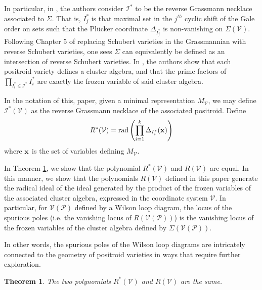 \documentclass[11pt]{article}
\newcommand{\cP}{\mathcal{P}}
\newcommand{\cV}{\mathcal{V}}
\newcommand{\VP}{\cV(\cP)}
\newcommand{\cI}{\mathcal{I}}
\newtheorem{thm}{Theorem}[section]
\theoremstyle{remark}
\theoremstyle{definition}
\begin{document}
In particular, in \cite{galashinlam19}, the authors consider $\cI^*$ to be the reverse Grassmann necklace associated to $\Sigma$. That is, $I^{\ast}_j$ is that maximal set in the $j^{th}$ cyclic shift of the Gale order on sets such that the Pl\"{u}cker coordinate $\Delta_{I^*_j}$ is non-vanishing on $\Sigma(\cV)$. Following Chapter 5 of \cite{Juggling} replacing Schubert varieties in the Grassmannian with reverse Schubert varieties, one sees $\Sigma$ can equivalently be defined as an intersection of reverse Schubert varieties. In \cite{SS-BW}, the authors show that each positroid variety defines a cluster algebra, and that the prime factors of $\prod_{I_i^\ast \in \cI^\ast}I_i^\ast$ are exactly the frozen variable of said cluster algebra. 

In the notation of this, paper, given a minimal representation $M_{\cV}$, we may define $\cI^\ast(\cV)$ as the reverse Grassmann necklace of the associated positroid. Define
%
\begin{displaymath}
R^{\ast}(\cV) = \mathrm{rad}\left(\prod_{i = 1}^{k} \Delta_{I^{\ast}_i}(\bf{x})\right)
\end{displaymath}
where $\bf{x}$ is the set of variables defining $M_{\cV}$.

In Theorem \ref{res:reversepoly}, we show that the polynomial $R^{\ast}(\cV)$ and $R(\cV)$ are equal. In this manner, we show that the polynomials $R(\cV)$ defined in this paper generate the radical ideal of the ideal generated by the product of the frozen variables of the associated cluster algebra, expressed in the coordinate system $\cV$. In particular, for $\VP$ defined by a Wilson loop diagram, the locus of the spurious poles (i.e. the vanishing locus of $R(\VP)$) is the vanishing locus of the frozen variables of the cluster algebra defined by $\Sigma(\VP)$. 

In other words, the spurious poles of the Wilson loop diagrams are intricately connected to the geometry of positroid varieties in ways that require further exploration.

\begin{thm}\label{res:reversepoly}
The two polynomials $R^{\ast}(\cV)$ and $R(\cV)$ are the same.
\end{thm}
\end{document}
